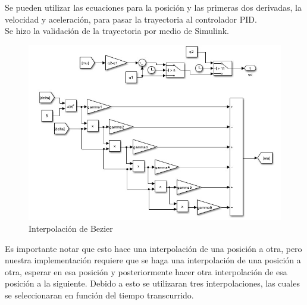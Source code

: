 Se pueden utilizar las ecuaciones para la posición y las primeras dos derivadas, la velocidad y aceleración, para pasar la trayectoria al controlador PID. \\
Se hizo la validación de la trayectoria por medio de Simulink. 
\begin{figure}[!htb]
    \centering
    \includegraphics[width=1\textwidth]{imagenes/BezierIn.jpg}
    \caption{\footnotesize Interpolación de Bezier}
    \label{fig:BezierIn}
\end{figure}
\FloatBarrier
Es importante notar que esto hace una interpolación de una posición a otra, pero nuestra implementación requiere que se haga una interpolación de una posición a otra, esperar en esa posición y posteriormente hacer otra interpolación de esa posición a la siguiente. Debido a esto se utilizaran tres interpolaciones, las cuales se seleccionaran en función del tiempo transcurrido.
